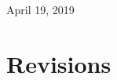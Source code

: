 \documentclass[tikz,a4paper,titlepage]{article}
\begin{document}
\begin{titlepage}

{\large April 19, 2019}\\[3cm] %




\vfill %

\end{titlepage}

\tableofcontents
\newpage

\section{Revisions}
\end{document}
